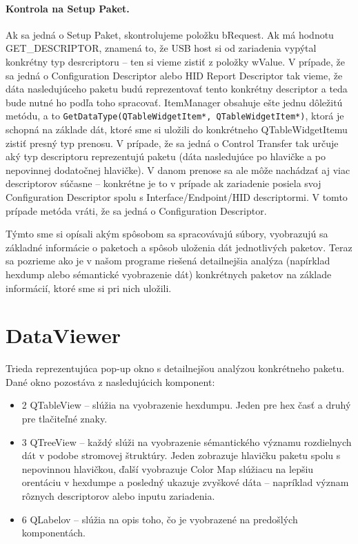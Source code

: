 \paragraph{Kontrola na Setup Paket.}
\hfill \break
Ak sa jedná o Setup Paket, skontrolujeme položku bRequest. Ak má hodnotu GET\_DESCRIPTOR, znamená to, že USB host si od zariadenia vypýtal konkrétny typ desrcriptoru -- ten si vieme zistiť z položky wValue. V prípade, že sa jedná o Configuration Descriptor alebo HID Report Descriptor tak vieme, že dáta nasledujúceho paketu budú reprezentovať tento konkrétny descriptor a teda bude nutné ho podľa toho spracovať.
\hfill \break \newline
ItemManager obsahuje ešte jednu dôležitú metódu, a to \texttt{GetDataType(QTable\-WidgetItem*, QTableWidgetItem*)}, ktorá je schopná na základe dát, ktoré sme si uložili do konkrétneho QTableWidgetItemu zistiť presný typ prenosu. V prípade, že sa jedná o Control Transfer tak určuje aký typ descriptoru reprezentujú  paketu (dáta nasledujúce po hlavičke a po nepovinnej dodatočnej hlavičke). V danom prenose sa ale môže nachádzať aj viac descriptorov súčasne -- konkrétne je to v prípade ak zariadenie posiela svoj Configuration Descriptor spolu s Interface/Endpoint/HID descriptormi. V tomto prípade metóda vráti, že sa jedná o Configuration Descriptor.

Týmto sme si opísali akým spôsobom sa spracovávajú súbory, vyobrazujú sa základné informácie o paketoch a spôsob uloženia dát jednotlivých paketov. Teraz sa pozrieme ako je v našom programe riešená detailnejšia analýza (napírklad hexdump alebo sémantické vyobrazenie dát) konkrétnych paketov na základe informácií, ktoré sme si pri nich uložili.

\section{DataViewer}
Trieda reprezentujúca pop-up okno s detailnejšou analýzou konkrétneho paketu. Dané okno pozostáva z nasledujúcich komponent:
\begin{itemize}
\item 2 QTableView -- slúžia na vyobrazenie hexdumpu. Jeden pre hex časť a druhý pre tlačiteľné znaky.
\item 3 QTreeView -- každý slúži na vyobrazenie sémantického významu rozdielnych dát v podobe stromovej štruktúry. Jeden zobrazuje hlavičku paketu spolu s nepovinnou hlavičkou, ďalší vyobrazuje Color Map slúžiacu na lepšiu orentáciu v hexdumpe a posledný ukazuje zvyškové dáta -- napríklad význam rôznych descriptorov alebo inputu zariadenia.
\item 6 QLabelov -- slúžia na opis toho, čo je vyobrazené na predošlých komponentách. 
\end{itemize}

